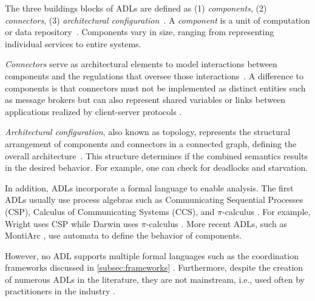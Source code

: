 \documentclass[runningheads]{llncs}
\begin{document}
The three buildings blocks of ADLs are defined as (1) \textit{components}, (2) \textit{connectors}, (3) \textit{architectural configuration}~\cite{medvidovicClassificationComparisonFramework2000,medvidovicFrameworkClassifyingComparing1997}.
A \textit{component} is a unit of computation or data repository~\cite{medvidovicClassificationComparisonFramework2000}.
Components vary in size, ranging from representing individual services to entire systems.

\textit{Connectors} serve as architectural elements to model interactions between components and the regulations that oversee those interactions~\cite{medvidovicClassificationComparisonFramework2000}.
A difference to components is that connectors must not be implemented as distinct entities such as message brokers but can also represent shared variables or links between applications realized by client-server protocols \cite{medvidovicClassificationComparisonFramework2000}.

\textit{Architectural configuration}, also known as topology, represents the structural arrangement of components and connectors in a connected graph, defining the overall architecture~\cite{medvidovicClassificationComparisonFramework2000}.
This structure determines if the combined semantics results in the desired behavior.
For example, one can check for deadlocks and starvation.

In addition, ADLs incorporate a formal language to enable analysis.
The first ADLs usually use process algebras such as Communicating Sequential Processes (CSP), Calculus of Communicating Systems (CCS), and $\pi$-calculus \cite{ozkayaAreWeThere2013}.
For example, Wright uses CSP \cite{allenFormalBasisArchitectural1997} while Darwin uses $\pi$-calculus \cite{mageeSpecifyingDistributedSoftware1995}.
More recent ADLs, such as MontiArc \cite{haberMontiArcArchitecturalModeling2014}, use automata to define the behavior of components.

However, no ADL supports multiple formal languages such as the coordination frameworks discussed in \autoref{subsec:frameworks} \cite{medvidovicClassificationComparisonFramework2000}.
Furthermore, despite the creation of numerous ADLs in the literature, they are not mainstream, i.e., used often by practitioners in the industry \cite{clementsSurveyArchitectureDescription1996,woodsArchitectureDescriptionLanguages2005,pandeyArchitecturalDescriptionLanguages2010,ozkayaAreWeThere2013}.
\end{document}
